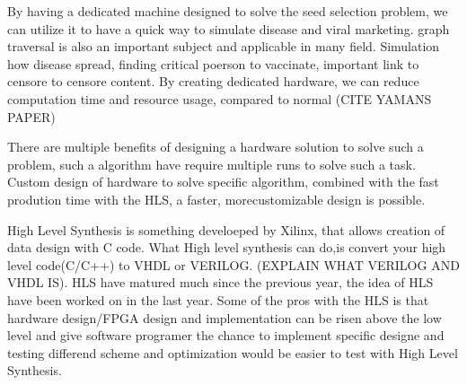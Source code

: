 By having a dedicated machine designed to solve the seed selection problem, we can utilize it to have a quick way to simulate disease and viral marketing. graph traversal is also an important subject and applicable in many field. Simulation how disease spread, finding critical poerson to vaccinate, important link to censore to censore content. By creating dedicated hardware, we can reduce computation time and resource usage, compared to normal  (CITE YAMANS PAPER)

There are multiple benefits of designing a hardware solution to solve such a problem, such a algorithm have require multiple runs to solve such a task. Custom design of hardware to solve specific algorithm, combined with the fast prodution time with the HLS, a faster, morecustomizable design is possible.

High Level Synthesis is something develoeped by Xilinx, that allows creation of data design with C code. What High level synthesis can do,is convert your high level code(C/C++) to VHDL or VERILOG. (EXPLAIN WHAT VERILOG AND VHDL IS). 
HLS have matured much since the previous year, the idea of HLS have been worked on in the last year. Some of the pros with the HLS is that hardware design/FPGA design and implementation can be risen above the low level and give software programer the chance to implement specific designe and testing differend scheme and optimization would be easier to test with High Level Synthesis.
